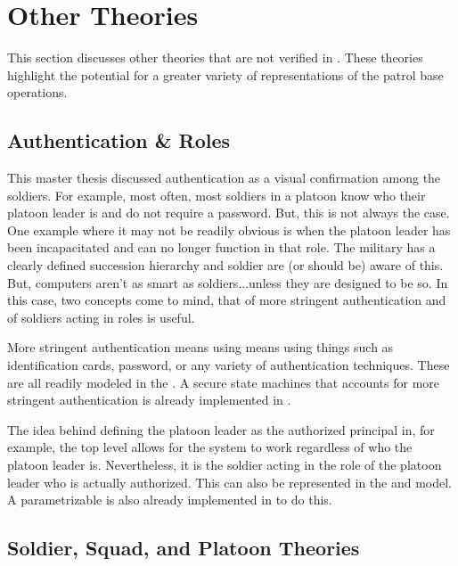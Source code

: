 \documentclass[../../main/main.tex]{subfiles}
\begin{document}
\chapter{Other Theories}
This section discusses other theories that are not verified in .  These theories highlight the potential for a greater variety of representations of the patrol base operations.  

\section{Authentication \& Roles}
This master thesis discussed authentication as a visual confirmation among the soldiers. For example, most often, most soldiers in a platoon know who their platoon leader is and do not require a password.  But, this is not always the case.  One example where it may not be readily obvious is when the platoon leader has been incapacitated and can no longer function in that role.  The military has a clearly defined succession hierarchy and soldier are (or should be) aware of this.  But, computers aren't as smart as soldiers...unless they are designed to be so.  In this case, two concepts come to mind, that of more stringent authentication and of soldiers acting in roles is useful.

More stringent authentication means using means using things such as identification cards, password, or any variety of authentication techniques.  These are all readily modeled in the .  A secure state machines that accounts for more stringent authentication is already implemented in .  

The idea behind defining the platoon leader as the authorized principal in, for example, the top level  allows for the system to work regardless of who the platoon leader is.  Nevertheless, it is the soldier acting in the role of the platoon leader who is actually authorized.  This can also be represented in the  and  model.  A parametrizable  is also already implemented in  to do this.


\section{Soldier, Squad, and Platoon Theories}
\end{document}
